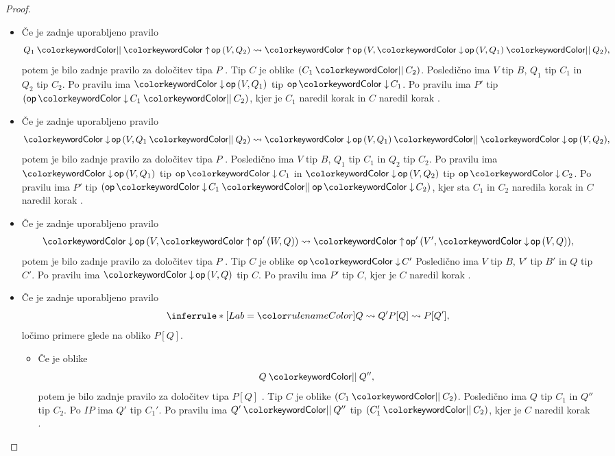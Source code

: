 \begin{proof}
\begin{itemize}
		\item Če je zadnje uporabljeno pravilo
		$$\tmpar{Q_1}{\tmopout{op}{V}{Q_2}} \reduces \tmopout{op}{V}{\tmpar{\tmopin{op}{V}{Q_1}}{Q_2}},$$
		potem je bilo zadnje pravilo za določitev tipa $P$ . Tip $C$ je oblike $\typar{C_1}{C_2}$.
		Posledično ima $V$ tip $B$, $Q_1$ tip $C_1$ in $Q_2$ tip $C_2$.
		Po pravilu  ima $\tmopin{op}{V}{Q_1}$ tip $\opincomp{op}{C_1}$.
		Po pravilu  ima $P'$ tip $\typar{\opincomp{op}{C_1}}{C_2}$, kjer je $C_1$ naredil korak  in $C$ naredil korak .
	
		\item Če je zadnje uporabljeno pravilo
		$$\tmopin{op}{V}{\tmpar{Q_1}{Q_2}} \reduces \tmpar {\tmopin{op}{V}{Q_1}} {\tmopin{op}{V}{Q_2}},$$
		potem je bilo zadnje pravilo za določitev tipa $P$ .
		Posledično ima $V$ tip $B$, $Q_1$ tip $C_1$ in $Q_2$ tip $C_2$.
		Po pravilu  ima $\tmopin{op}{V}{Q_1}$ tip $\opincomp{op}{C_1}$ in $\tmopin{op}{V}{Q_2}$ tip $\opincomp{op}{C_2}$.
		Po pravilu  ima $P'$ tip $\typar{\opincomp{op}{C_1}}{\opincomp{op}{C_2}}$, kjer sta $C_1$ in $C_2$ naredila korak  in $C$ naredil korak .
		
		\item Če je zadnje uporabljeno pravilo
		$$\tmopin{op}{V}{\tmopout{op'}{W}{Q}} \reduces \tmopout{op'}{V'}{\tmopin{op}{V}{Q}},$$
		potem je bilo zadnje pravilo za določitev tipa $P$ . Tip $C$ je oblike $\opincomp{op}{C'}$
		Posledično ima $V$ tip $B$, $V'$ tip $B'$ in $Q$ tip $C'$.
		Po pravilu  ima $\tmopin{op}{V}{Q}$ tip $C$.
		Po pravilu  ima $P'$ tip $C$, kjer je $C$ naredil korak .
		
		\item Če je zadnje uporabljeno pravilo
		$$\coopinfer{}{
						Q \reduces Q'
					}{
						P[Q] \reduces P[Q']
					},$$
		ločimo primere glede na obliko $P[Q]$.
		\begin{itemize}
			\item Če je oblike $$\tmpar{Q}{Q''},$$ potem je bilo zadnje pravilo za določitev tipa $P[Q]$ . Tip $C$ je oblike $\typar{C_1}{C_2}$.
			Posledično ima $Q$ tip $C_1$ in $Q''$ tip $C_2$.
			Po $IP$ ima $Q'$ tip $C_1'$.
			Po pravilu  ima $\tmpar{Q'}{Q''}$ tip $\typar{C_1'}{C_2}$, kjer je $C$ naredil korak .
			

\end{itemize}
\end{itemize}
\end{proof}
